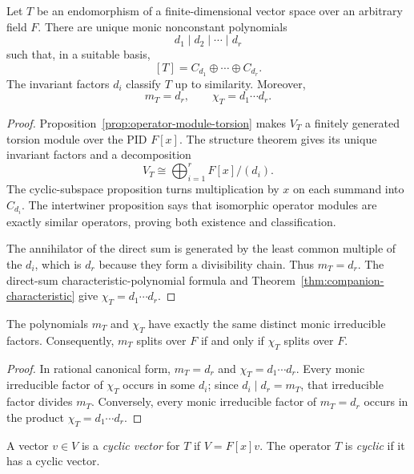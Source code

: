 \begin{theorem}\label{thm:rational-canonical-form}
Let \(T\) be an endomorphism of a finite-dimensional vector space over an
arbitrary field \(F\).  There are unique monic nonconstant polynomials
\[
d_1\mid d_2\mid\cdots\mid d_r
\]
such that, in a suitable basis,
\[
[T]=C_{d_1}\oplus\cdots\oplus C_{d_r}.
\]
The invariant factors \(d_i\) classify \(T\) up to similarity.  Moreover,
\[
m_T=d_r,
\qquad
\chi_T=d_1\cdots d_r.
\]
\end{theorem}
\begin{proof}
Proposition~\ref{prop:operator-module-torsion} makes \(V_T\) a finitely
generated torsion module over the PID \(F[x]\).  The structure theorem gives
its unique invariant factors and a decomposition
\[
V_T\cong\bigoplus_{i=1}^rF[x]/(d_i).
\]
The cyclic-subspace proposition turns multiplication by \(x\) on each
summand into \(C_{d_i}\).  The intertwiner proposition says that isomorphic
operator modules are exactly similar operators, proving both existence and
classification.

The annihilator of the direct sum is generated by the least common multiple
of the \(d_i\), which is \(d_r\) because they form a divisibility chain.
Thus \(m_T=d_r\).  The direct-sum characteristic-polynomial formula and
Theorem~\ref{thm:companion-characteristic} give
\(\chi_T=d_1\cdots d_r\).
\end{proof}

\begin{corollary}
\label{cor:minimal-characteristic-factors}
The polynomials \(m_T\) and \(\chi_T\) have exactly the same distinct monic
irreducible factors. Consequently, \(m_T\) splits over \(F\) if and only if
\(\chi_T\) splits over \(F\).
\end{corollary}
\begin{proof}
In rational canonical form, \(m_T=d_r\) and
\(\chi_T=d_1\cdots d_r\). Every monic irreducible factor of \(\chi_T\)
occurs in some \(d_i\); since \(d_i\mid d_r=m_T\), that irreducible factor
divides \(m_T\). Conversely, every monic irreducible factor of
\(m_T=d_r\) occurs in the product \(\chi_T=d_1\cdots d_r\).
\end{proof}

\begin{definition}
A vector \(v\in V\) is a \emph{cyclic vector} for \(T\) if
\(V=F[x]v\). The operator \(T\) is \emph{cyclic} if it has a cyclic vector.
\end{definition}


